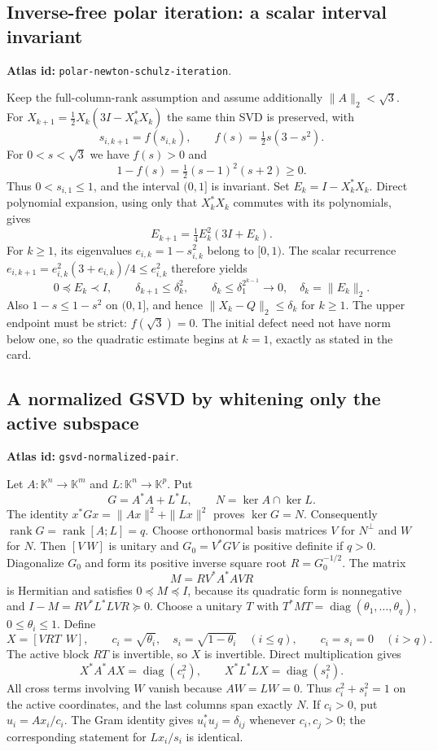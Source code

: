 \documentclass[11pt,a4paper]{article}
\DeclareMathOperator{\diag}{diag}
\DeclareMathOperator{\rank}{rank}
\DeclareRobustCommand{\code}[1]{{\footnotesize\urlstyle{tt}\nolinkurl{#1}}}
\begin{document}
\subsection{Inverse-free polar iteration: a scalar interval invariant}
\label{sec:eq-polar-schulz}
\textbf{Atlas id:} \code{polar-newton-schulz-iteration}.

Keep the full-column-rank assumption and assume additionally
$\|A\|_2<\sqrt3$. For
$X_{k+1}=\tfrac12X_k(3I-X_k^*X_k)$ the same thin SVD is preserved, with
\[
 s_{i,k+1}=f(s_{i,k}),\qquad f(s)=\tfrac12s(3-s^2).
\]
For $0<s<\sqrt3$ we have $f(s)>0$ and
\[
 1-f(s)=\tfrac12(s-1)^2(s+2)\ge0.
\]
Thus $0<s_{i,1}\le1$, and the interval $(0,1]$ is invariant.
Set $E_k=I-X_k^*X_k$. Direct polynomial expansion, using only that
$X_k^*X_k$ commutes with its polynomials, gives
\begin{equation}\label{eq:eq-polar-defect}
 E_{k+1}=\tfrac14 E_k^2(3I+E_k).
\end{equation}
For $k\ge1$, its eigenvalues $e_{i,k}=1-s_{i,k}^2$ belong to $[0,1)$.
The scalar recurrence
$e_{i,k+1}=e_{i,k}^2(3+e_{i,k})/4\le e_{i,k}^2$ therefore yields
\[
 0\preceq E_k\prec I,\qquad
 \delta_{k+1}\le\delta_k^2,\qquad
 \delta_k\le\delta_1^{2^{k-1}}\longrightarrow0,
 \quad\delta_k=\|E_k\|_2.
\]
Also $1-s\le1-s^2$ on $(0,1]$, and hence
$\|X_k-Q\|_2\le\delta_k$ for $k\ge1$.
The upper endpoint must be strict: $f(\sqrt3)=0$. The initial defect
need not have norm below one, so the quadratic estimate begins at
$k=1$, exactly as stated in the card.

\subsection{A normalized GSVD by whitening only the active subspace}
\label{sec:eq-gsvd}
\textbf{Atlas id:} \code{gsvd-normalized-pair}.

Let $A:\mathbb K^n\to\mathbb K^m$ and
$L:\mathbb K^n\to\mathbb K^p$. Put
\[
 G=A^*A+L^*L,\qquad N=\ker A\cap\ker L.
\]
The identity $x^*Gx=\|Ax\|^2+\|Lx\|^2$ proves
$\ker G=N$. Consequently $\rank G=\rank[A;L]=q$.
Choose orthonormal basis matrices $V$ for $N^\perp$ and $W$ for $N$.
Then $[V\ W]$ is unitary and $G_0=V^*GV$ is positive definite if $q>0$.
Diagonalize $G_0$ and form its positive inverse square root $R=G_0^{-1/2}$.
The matrix
\[
 M=R V^*A^*AV R
\]
is Hermitian and satisfies $0\preceq M\preceq I$, because its quadratic
form is nonnegative and
$I-M=RV^*L^*LV R\succeq0$. Choose a unitary $T$ with
$T^*MT=\diag(\theta_1,\ldots,\theta_q)$, $0\le\theta_i\le1$.
Define
\[
 X=[VR T\ \ W],\qquad
 c_i=\sqrt{\theta_i},\quad s_i=\sqrt{1-\theta_i}\quad(i\le q),
 \qquad c_i=s_i=0\quad(i>q).
\]
The active block $RT$ is invertible, so $X$ is invertible. Direct
multiplication gives
\[
 X^*A^*AX=\diag(c_i^2),\qquad
 X^*L^*LX=\diag(s_i^2).
\]
All cross terms involving $W$ vanish because $AW=LW=0$.
Thus $c_i^2+s_i^2=1$ on the active coordinates, and the last columns
span exactly $N$. If $c_i>0$, put $u_i=Ax_i/c_i$. The Gram identity
gives $u_i^*u_j=\delta_{ij}$ whenever $c_i,c_j>0$; the corresponding
statement for $Lx_i/s_i$ is identical.
\end{document}
